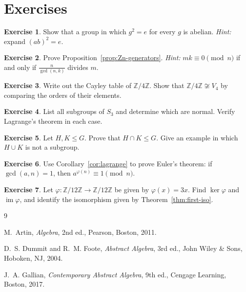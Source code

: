 \documentclass[11pt]{article}
\theoremstyle{plain}
\theoremstyle{definition}
\newtheorem{exercise}{Exercise}
\theoremstyle{remark}
\newcommand{\Z}{\mathbb{Z}}
\DeclareMathOperator{\im}{im}
\begin{document}
\section{Exercises}

\begin{exercise}
Show that a group in which $g^2 = e$ for every $g$ is abelian. \emph{Hint:} expand $(ab)^2 = e$.
\end{exercise}

\begin{exercise}\label{ex:Zn-order}
Prove Proposition~\ref{prop:Zn-generators}. \emph{Hint:} $mk \equiv 0 \pmod n$ if and only if $\frac{n}{\gcd(n,k)}$ divides $m$.
\end{exercise}

\begin{exercise}
Write out the Cayley table of $\Z/4\Z$. Show that $\Z/4\Z \not\cong V_4$ by comparing the orders of their elements.
\end{exercise}

\begin{exercise}
List all subgroups of $S_3$ and determine which are normal. Verify Lagrange's theorem in each case.
\end{exercise}

\begin{exercise}
Let $H, K \le G$. Prove that $H \cap K \le G$. Give an example in which $H \cup K$ is not a subgroup.
\end{exercise}

\begin{exercise}
Use Corollary~\ref{cor:lagrange} to prove Euler's theorem: if $\gcd(a, n) = 1$, then $a^{\varphi(n)} \equiv 1 \pmod n$.
\end{exercise}

\begin{exercise}
Let $\varphi\colon \Z/12\Z \to \Z/12\Z$ be given by $\varphi(x) = 3x$. Find $\ker\varphi$ and $\im\varphi$, and identify the isomorphism given by Theorem~\ref{thm:first-iso}.
\end{exercise}

\begin{thebibliography}{9}

M.~Artin, \emph{Algebra}, 2nd ed., Pearson, Boston, 2011.

D.~S. Dummit and R.~M. Foote, \emph{Abstract Algebra}, 3rd ed., John Wiley \& Sons, Hoboken, NJ, 2004.

J.~A. Gallian, \emph{Contemporary Abstract Algebra}, 9th ed., Cengage Learning, Boston, 2017.

\end{thebibliography}
\end{document}
